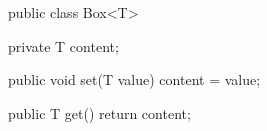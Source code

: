 \begin{unipdcode}[language=Java]
public class Box<T> {
    private T content;

    public void set(T value) {
        content = value;
    }

    public T get() {
        return content;
    }
}
\end{unipdcode}
